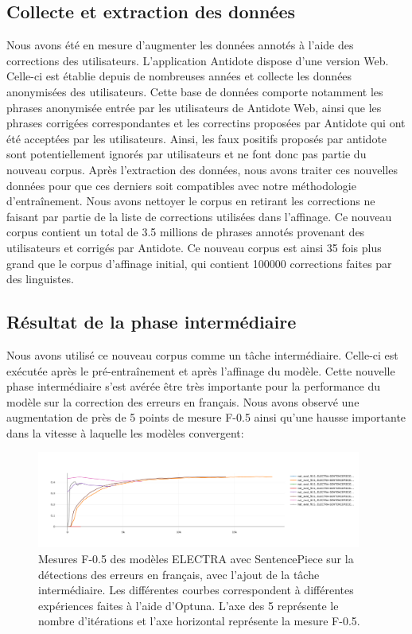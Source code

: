 \documentclass[12pt,twoside,maitrise]{dms}
\theoremstyle{definition}
\numberwithin{equation}{section}
\numberwithin{table}{chapter}
\numberwithin{figure}{chapter}
\begin{document}
\subsection{Collecte et extraction des données}
Nous avons été en mesure d'augmenter les données annotés à l'aide des
corrections des utilisateurs. L'application Antidote dispose d'une version
Web. Celle-ci est établie depuis de nombreuses années et collecte les données
anonymisées des utilisateurs. Cette base de données comporte notamment les
phrases anonymisée entrée par les utilisateurs de Antidote Web, ainsi que les
phrases corrigées correspondantes et les correctins proposées par Antidote
qui ont été acceptées par les utilisateurs. Ainsi, les faux positifs proposés
par antidote sont potentiellement ignorés par utilisateurs et ne font donc pas
partie du nouveau corpus.
Après l'extraction des données, nous avons traiter ces nouvelles données pour
que ces derniers soit compatibles avec notre méthodologie d'entraînement. Nous
avons nettoyer le corpus en retirant les corrections ne faisant par partie de
la liste de corrections utilisées dans l'affinage. Ce nouveau corpus contient un
total de 3.5 millions de phrases annotés provenant des utilisateurs et corrigés
par Antidote. Ce nouveau corpus est ainsi 35 fois plus grand que le corpus
d'affinage initial, qui contient 100000 corrections faites par des linguistes.
\subsection{Résultat de la phase intermédiaire}
Nous avons utilisé ce nouveau corpus comme un tâche intermédiaire. Celle-ci est exécutée après le pré-entraînement et après l'affinage du modèle. Cette nouvelle phase intermédiaire s'est avérée être très importante pour la performance du modèle sur la correction des erreurs en français. Nous avons observé une augmentation de près de 5 points de mesure F-0.5 ainsi qu'une hausse importante dans la vitesse à laquelle les modèles convergent:
 
\begin{figure}
	\begin{center}
		\includegraphics[width=0.95\textwidth]{figures/electrasentencepieceawebf05optuna.png}
	\end{center}
	\caption{Mesures F-0.5 des modèles ELECTRA avec SentencePiece sur la détections des erreurs en français, avec l'ajout de la tâche intermédiaire. Les différentes courbes correspondent à différentes expériences faites à l'aide d'Optuna. L'axe des 5 représente le nombre d'itérations et l'axe horizontal représente la mesure F-0.5.}\label{fig:electraaweb}
\end{figure}
\end{document}
